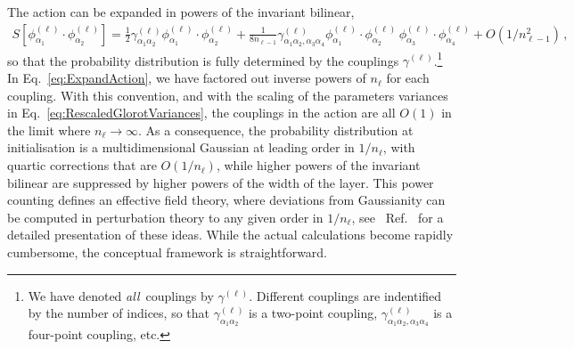The action can be expanded in powers of the invariant bilinear,
\begin{align}
    \label{eq:ExpandAction}
    S\left[\phi^{(\ell)}_{\alpha_1}
            \cdot \phi^{(\ell)}_{\alpha_2}\right] =
        \frac12 \gamma^{(\ell)}_{\alpha_1\alpha_2}
            \phi^{(\ell)}_{\alpha_1} \cdot \phi^{(\ell)}_{\alpha_2} +
            \frac{1}{8 n_{\ell-1}} \gamma^{(\ell)}_{\alpha_1\alpha_2,\alpha_3\alpha_4}
            \phi^{(\ell)}_{\alpha_1} \cdot \phi^{(\ell)}_{\alpha_2} \,
            \phi^{(\ell)}_{\alpha_3} \cdot \phi^{(\ell)}_{\alpha_4} + O(1/n_{\ell-1}^2)\, ,
\end{align}
so that the probability distribution is fully determined by the couplings 
$\gamma^{(\ell)}$.\footnote{
    We have denoted {\em all}\ couplings by $\gamma^{{(\ell)}}$. Different couplings 
    are indentified by the number of indices, so that $\gamma^{(\ell)}_{\alpha_1\alpha_2}$ 
    is a two-point coupling, $\gamma^{(\ell)}_{\alpha_1\alpha_2,\alpha_3\alpha_4}$ is a four-point 
    coupling, etc. 
} 
In
Eq.~\eqref{eq:ExpandAction}, we have factored out inverse powers of $n_\ell$ for each coupling.
With this convention, and with the scaling of the parameters variances in
Eq.~\eqref{eq:RescaledGlorotVariances}, the couplings in the action are all $O(1)$
in the limit where $n_\ell\to\infty$.
As a consequence, the probability distribution at initialisation is a multidimensional Gaussian at
leading order in $1/n_\ell$, with quartic corrections that are $O(1/n_\ell)$, while higher powers
of the invariant bilinear are suppressed by higher powers of the width of the layer. This power counting
defines an effective field theory, where deviations from Gaussianity can be computed in perturbation
theory to any given order in $1/n_\ell$, see \eg\ Ref.~\cite{Roberts:2021fes} for a detailed
presentation of these ideas. While the actual calculations become rapidly cumbersome, the
conceptual framework is straightforward.

